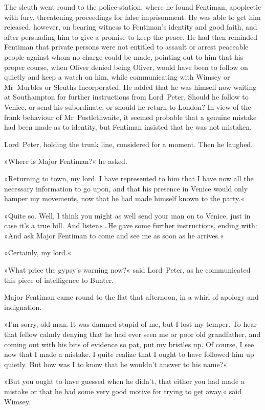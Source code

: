 The sleuth went round to the police-station, where he found Fentiman, apoplectic with fury, threatening proceedings for false imprisonment. He was able to get him released, however, on bearing witness to Fentiman's identity and good faith, and after persuading him to give a promise to keep the peace. He had then reminded Fentiman that private persons were not entitled to assault or arrest peaceable people against whom no charge could be made, pointing out to him that his proper course, when Oliver denied being Oliver, would have been to follow on quietly and keep a watch on him, while communicating with Wimsey or Mr~Murbles or Sleuths Incorporated. He added that he was himself now waiting at Southampton for further instructions from Lord~Peter. Should he follow to Venice, or send his subordinate, or should he return to London? In view of the frank behaviour of Mr~Postlethwaite, it seemed probable that a genuine mistake had been made as to identity, but Fentiman insisted that he was not mistaken.

Lord~Peter, holding the trunk line, considered for a moment. Then he laughed.

»Where is Major Fentiman?« he asked.

»Returning to town, my lord. I have represented to him that I have now all the necessary information to go upon, and that his presence in Venice would only hamper my movements, now that he had made himself known to the party.«

»Quite so. Well, I think you might as well send your man on to Venice, just in case it's a true bill. And listen«\dots He gave some further instructions, ending with: »And ask Major Fentiman to come and see me as soon as he arrives.«

»Certainly, my lord.«

»What price the gypsy's warning now?« said Lord~Peter, as he communicated this piece of intelligence to Bunter.

Major Fentiman came round to the flat that afternoon, in a whirl of apology and indignation.

»I'm sorry, old man. It was damned stupid of me, but I lost my temper. To hear that fellow calmly denying that he had ever seen me or poor old grandfather, and coming out with his bits of evidence so pat, put my bristles up. Of course, I see now that I made a mistake. I quite realize that I ought to have followed him up quietly. But how was I to know that he wouldn't answer to his name?«

»But you ought to have guessed when he didn't, that either you had made a mistake or that he had some very good motive for trying to get away,« said Wimsey.


